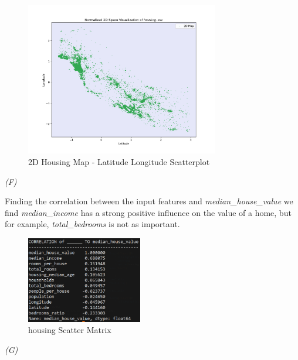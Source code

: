 \documentclass[10pt]{article}
\begin{document}
\begin{figure}[!h]
    \includegraphics[width=0.75\textwidth]{../plots/q1/2d_housing_scatter.png}
    \centering
    \caption{2D Housing Map - Latitude Longitude Scatterplot}
\end{figure}

\textit{(F)}

\smallskip
Finding the correlation between the input features and \textit{median\_house\_value} we find \textit{median\_income} has a strong positive influence on the value of a home, but for example, \textit{total\_bedrooms} is not as important.

\begin{figure}[!h]
    \includegraphics[width=0.45\textwidth]{../logs/housing_corr.png}
    \centering
    \caption{housing Scatter Matrix}
\end{figure}

\clearpage

\smallskip
\textit{(G)}

\smallskip
\end{document}
